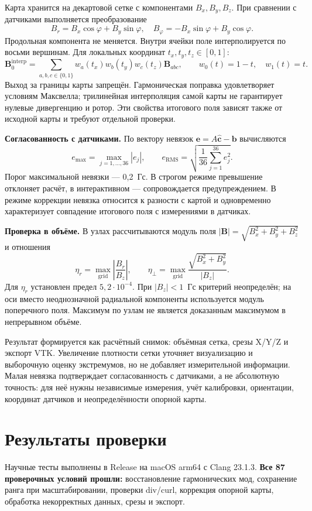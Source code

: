 \documentclass[a4paper,11pt]{article}
\begin{document}
Карта хранится на декартовой сетке с компонентами $B_x,B_y,B_z$.
При сравнении с датчиками выполняется преобразование
\[
 B_r=B_x\cos\varphi+B_y\sin\varphi,\quad
 B_\varphi=-B_x\sin\varphi+B_y\cos\varphi.
\]
Продольная компонента не меняется. Внутри ячейки поле интерполируется
по восьми вершинам. Для локальных координат $t_x,t_y,t_z\in[0,1]$:
\[
 \mathbf B_0^{\mathrm{interp}}=
 \sum_{a,b,c\in\{0,1\}}w_a(t_x)w_b(t_y)w_c(t_z)\mathbf B_{abc},
 \qquad w_0(t)=1-t,\quad w_1(t)=t.
\]
Выход за границы карты запрещён. Гармоническая поправка удовлетворяет
условиям Максвелла; трилинейная интерполяция самой карты не гарантирует
нулевые дивергенцию и ротор. Эти свойства итогового поля зависят также
от исходной карты и требуют отдельной проверки.

\textbf{Согласованность с датчиками.} По вектору невязок
$\mathbf e=A\widehat{\mathbf c}-\mathbf b$ вычисляются
\[
 e_{\max}=\max_{j=1,\ldots,36}|e_j|,\qquad
 e_{\mathrm{RMS}}=\sqrt{\frac{1}{36}\sum_{j=1}^{36}e_j^2}.
\]
Порог максимальной невязки — 0,2~Гс. В строгом режиме превышение
отклоняет расчёт, в интерактивном — сопровождается предупреждением.
В режиме коррекции невязка относится к разности с картой и одновременно
характеризует совпадение итогового поля с измерениями в датчиках.

\textbf{Проверка в объёме.} В узлах рассчитываются модуль поля
$|\mathbf B|=\sqrt{B_x^2+B_y^2+B_z^2}$ и отношения
\[
 \eta_r=\max_{\mathrm{grid}}\left|\frac{B_r}{B_z}\right|,
 \qquad
 \eta_\perp=\max_{\mathrm{grid}}\frac{\sqrt{B_x^2+B_y^2}}{|B_z|}.
\]
Для $\eta_r$ установлен предел $5{,}2\cdot10^{-4}$.
При $|B_z|<1$~Гс критерий неопределён; на оси вместо неоднозначной
радиальной компоненты используется модуль поперечного поля.
Максимум по узлам не является доказанным максимумом в непрерывном объёме.

Результат формируется как расчётный снимок: объёмная сетка, срезы X/Y/Z
и экспорт VTK. Увеличение плотности сетки уточняет визуализацию и выборочную
оценку экстремумов, но не добавляет измерительной информации.
Малая невязка подтверждает согласованность с датчиками, а не абсолютную
точность: для неё нужны независимые измерения, учёт калибровки,
ориентации, координат датчиков и неопределённости опорной карты.

\clearpage
\section{Результаты проверки}

Научные тесты выполнены в Release на macOS arm64 с Clang 23.1.3.
\textbf{Все 87 проверочных условий прошли:} восстановление гармонических
мод, сохранение ранга при масштабировании, проверки div/curl,
коррекция опорной карты, обработка некорректных данных, срезы и экспорт.
\end{document}

